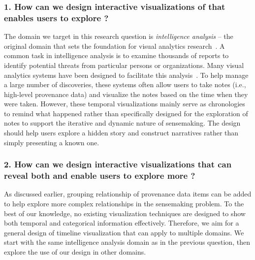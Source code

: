 \subsubsection*{1. How can we design interactive visualizations of  that enables users to explore ?}
The domain we target in this research question is \emph{intelligence analysis} -- the original domain that sets the foundation for visual analytics research~\cite{Thomas2005}. A common task in intelligence analysis is to examine thousands of reports to identify potential threats from particular persons or organizations. Many visual analytics systems have been designed to facilitate this analysis~\cite{Wright2006,Stasko2007}. To help manage a large number of discoveries, these systems often allow users to take notes (i.e., high-level provenance data) and visualize the notes based on the time when they were taken. However, these temporal visualizations mainly serve as chronologies to remind what happened rather than specifically designed for the exploration of notes to support the iterative and dynamic nature of sensemaking. The design should help users explore a hidden story and construct narratives rather than simply presenting a known one.

\subsubsection*{2. How can we design interactive visualizations that can reveal both  and enable users to explore more ?}
As discussed earlier, grouping relationship of provenance data items can be added  to help explore more complex relationships in the sensemaking problem. To the best of our knowledge, no existing visualization techniques are designed to show both temporal and categorical information effectively. Therefore, we aim for a general design of timeline visualization that can apply to multiple domains. We start with the same intelligence analysis domain as in the previous question, then explore the use of our design in other domains.

